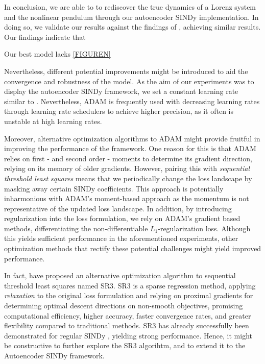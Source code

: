 In conclusion, we are able to to rediscover the true dynamics of a Lorenz system and the nonlinear pendulum through our autoencoder SINDy implementation. 
In doing so, we validate our results against the findings of \textcite{Champion_2019}, achieving similar results. 
Our findings indicate that

Our best model lacks \ref{FIGUREN} 

Nevertheless, different potential improvements might be introduced to aid the convergence and robustness of the model. 
As the aim of our experiments was to display the autoencoder SINDy framework, we set a constant learning rate similar to \textcite{Champion_2019}. 
Nevertheless, \textsc{ADAM} is frequently used with decreasing learning rates through learning rate schedulers to achieve higher precision, as it often is unstable at high learning rates. 

Moreover, alternative optimization algorithms to \textsc{ADAM} might provide fruitful in improving the performance of the framework. 
One reason for this is that \textsc{ADAM} relies on first - and second order - moments to determine its gradient direction, relying on its memory of older gradients. 
However, pairing this with \textit{sequential threshold least squares} means that we periodically change the loss landscape by masking away certain SINDy coefficients. 
This approach is potentially inharmonious with \textsc{ADAM}'s moment-based approach as the momentum is not representative of the updated loss landscape. 
In addition, by introducing regularization into the loss formulation, we rely on \textsc{ADAM}'s gradient based methods, differentiating the non-differentiable $L_1$-regularization loss.
Although this yields sufficient performance in the aforementioned experiments, other optimization methods that rectify these potential challenges might yield improved performance. 

In fact, \textcite{SR3} have proposed an alternative optimization algorithm to sequential threshold least squares named SR3. 
SR3 is a sparse regression method, applying \textit{relaxation} to the original loss formulation and relying on proximal gradients for determining optimal descent directions on non-smooth objectives, promising computational efficiency, higher accuracy, faster convergence rates, and greater flexibility compared to traditional methods. 
SR3 has already successfully been demonstrated for regular SINDy \cite{SR3_SINDy}, yielding strong performance. 
Hence, it might be constructive to further explore the SR3 algorihtm, and to extend it to the Autoencoder SINDy framework. 

